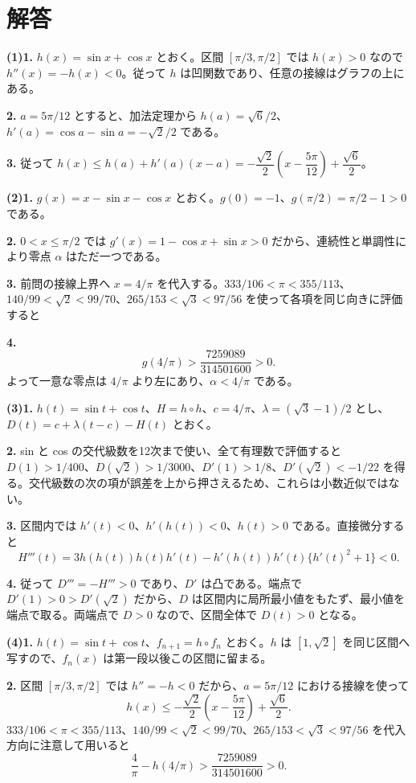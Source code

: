 \documentclass[uplatex,dvipdfmx,11pt]{jsarticle}
\begin{document}
\section*{解答}
\textbf{(1)}\quad \textbf{1.} \(h(x)=\sin x+\cos x\) とおく。区間 \([\pi/3,\pi/2]\) では \(h(x)>0\) なので \(h''(x)=-h(x)<0\)。従って \(h\) は凹関数であり、任意の接線はグラフの上にある。

\textbf{2.} \(a=5\pi/12\) とすると、加法定理から \(h(a)=\sqrt6/2\)、\(h'(a)=\cos a-\sin a=-\sqrt2/2\) である。

\textbf{3.} 従って \(h(x)\le h(a)+h'(a)(x-a)=-\dfrac{\sqrt2}2(x-\dfrac{5\pi}{12})+\dfrac{\sqrt6}2\)。

\textbf{(2)}\quad \textbf{1.} \(g(x)=x-\sin x-\cos x\) とおく。\(g(0)=-1\)、\(g(\pi/2)=\pi/2-1>0\) である。

\textbf{2.} \(0<x\le\pi/2\) では \(g'(x)=1-\cos x+\sin x>0\) だから、連続性と単調性により零点 \(\alpha\) はただ一つである。

\textbf{3.} 前問の接線上界へ \(x=4/\pi\) を代入する。\(333/106<\pi<355/113\)、\(140/99<\sqrt2<99/70\)、\(265/153<\sqrt3<97/56\) を使って各項を同じ向きに評価すると

\textbf{4.} \[g(4/\pi)>\frac{7259089}{314501600}>0.\]よって一意な零点は \(4/\pi\) より左にあり、\(\alpha<4/\pi\) である。

\textbf{(3)}\quad \textbf{1.} \(h(t)=\sin t+\cos t\)、\(H=h\circ h\)、\(c=4/\pi\)、\(\lambda=(\sqrt3-1)/2\) とし、\(D(t)=c+\lambda(t-c)-H(t)\) とおく。

\textbf{2.} sin と cos の交代級数を12次まで使い、全て有理数で評価すると \(D(1)>1/400\)、\(D(\sqrt2)>1/3000\)、\(D'(1)>1/8\)、\(D'(\sqrt2)<-1/22\) を得る。交代級数の次の項が誤差を上から押さえるため、これらは小数近似ではない。

\textbf{3.} 区間内では \(h'(t)<0\)、\(h'(h(t))<0\)、\(h(t)>0\) である。直接微分すると \[H'''(t)=3h(h(t))h(t)h'(t)-h'(h(t))h'(t)\{h'(t)^2+1\}<0.\]

\textbf{4.} 従って \(D'''=-H'''>0\) であり、\(D'\) は凸である。端点で \(D'(1)>0>D'(\sqrt2)\) だから、\(D\) は区間内に局所最小値をもたず、最小値を端点で取る。両端点で \(D>0\) なので、区間全体で \(D(t)>0\) となる。

\textbf{(4)}\quad \textbf{1.} \(h(t)=\sin t+\cos t\)、\(f_{n+1}=h\circ f_n\) とおく。\(h\) は \([1,\sqrt2]\) を同じ区間へ写すので、\(f_n(x)\) は第一段以後この区間に留まる。

\textbf{2.} 区間 \([\pi/3,\pi/2]\) では \(h''=-h<0\) だから、\(a=5\pi/12\) における接線を使って \[h(x)\le-\frac{\sqrt2}{2}\left(x-\frac{5\pi}{12}\right)+\frac{\sqrt6}{2}.\] \(333/106<\pi<355/113\)、\(140/99<\sqrt2<99/70\)、\(265/153<\sqrt3<97/56\) を代入方向に注意して用いると \[\frac4\pi-h(4/\pi)>\frac{7259089}{314501600}>0.\]
\end{document}
